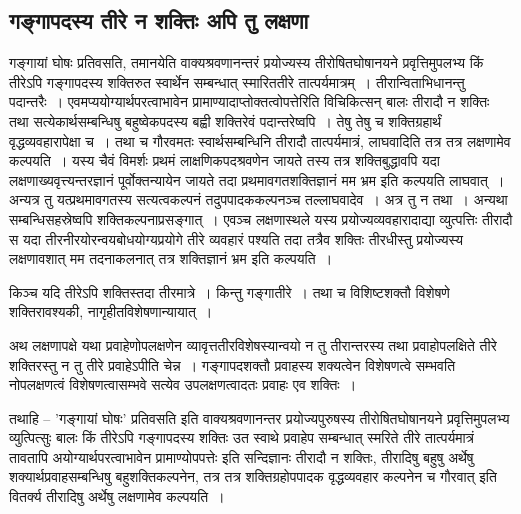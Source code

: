 			\subsection{}
			
				\begin{small}
			
			
				\end{small}
			
			\subsection{गङ्गापदस्य तीरे न शक्तिः अपि तु लक्षणा}

				\begin{small}
				
					गङ्गायां घोषः प्रतिवसति, तमानयेति वाक्यश्रवणानन्तरं प्रयोज्यस्य तीरोषितघोषानयने प्रवृत्तिमुपलभ्य किं तीरेऽपि गङ्गापदस्य शक्तिरुत स्वार्थेन सम्बन्धात् स्मारिततीरे तात्पर्यमात्रम्~। तीरान्विताभिधानन्तु पदान्तरैः~। एवमप्ययोग्यार्थपरत्वाभावेन प्रामाण्यादाप्तोक्तत्वोपत्तेरिति विचिकित्सन् बालः तीरादौ न शक्तिः तथा सत्येकार्थसम्बन्धिषु बहुष्वेकपदस्य बह्वी शक्तिरेवं पदान्तरेष्वपि~। तेषु तेषु च शक्तिग्रहार्थं वृद्धव्यवहारापेक्षा च~। तथा च गौरवमतः स्वार्थसम्बन्धिनि तीरादौ तात्पर्यमात्रं, लाघवादिति तत्र तत्र लक्षणामेव कल्पयति~। यस्य चैवं विमर्शः प्रथमं लाक्षणिकपदश्रवणेन जायते तस्य तत्र शक्तिबुद्धावपि यदा लक्षणाख्यवृत्त्यन्तरज्ञानं पूर्वोक्तन्यायेन जायते तदा प्रथमावगतशक्तिज्ञानं मम भ्रम इति कल्पयति लाघवात्~। अन्यत्र तु यत्प्रथमावगतस्य सत्यत्वकल्पनं तदुपपादककल्पनञ्च तल्लाघवादेव~। अत्र तु न तथा~। अन्यथा सम्बन्धिसहस्रेष्वपि शक्तिकल्पनाप्रसङ्गात्~। एवञ्च लक्षणास्थले यस्य प्रयोज्यव्यवहारादाद्या व्युत्पत्तिः तीरादौ स यदा तीरनीरयोरन्वयबोधयोग्यप्रयोगे तीरे व्यवहारं पश्यति तदा तत्रैव शक्तिः तीरधीस्तु प्रयोज्यस्य लक्षणावशात् मम तदनाकलनात् तत्र शक्तिज्ञानं भ्रम इति कल्पयति~। 
					
					किञ्च यदि तीरेऽपि शक्तिस्तदा तीरमात्रे~। किन्तु गङ्गातीरे~। तथा च विशिष्टशक्तौ विशेषणे शक्तिरावश्यकी, नागृहीतविशेषणान्यायात्~।
	
					अथ लक्षणापक्षे यथा प्रवाहेणोपलक्षणेन व्यावृत्ततीरविशेषस्यान्वयो न तु तीरान्तरस्य तथा प्रवाहोपलक्षिते तीरे शक्तिरस्तु न तु तीरे प्रवाहेऽपीति चेन्न~। गङ्गापदशक्तौ प्रवाहस्य शक्यत्वेन विशेषणत्वे सम्भवति नोपलक्षणत्वं विशेषणत्वासम्भवे सत्येव उपलक्षणत्वादतः प्रवाहः एव शक्तिः~। 
				\end{small}
 
				तथाहि – ’गङ्गायां घोषः’ प्रतिवसति इति वाक्यश्रवणानन्तर प्रयोज्यपुरुषस्य तीरोषितघोषानयने प्रवृत्तिमुपलभ्य व्युत्पित्सुः बालः किं तीरेऽपि गङ्गापदस्य शक्तिः उत स्वाथे प्रवाहेप सम्बन्धात् स्मरिते तीरे तात्पर्यमात्रं तावतापि अयोग्यार्थपरत्वाभावेन प्रामाण्योपपत्तेः इति सन्दिज्ञानः तीरादौ न शक्तिः,  तीरादिषु बहुषु अर्थेषु शक्यार्थप्रवाहसम्बन्धिषु बहुशक्तिकल्पनेन, तत्र तत्र शक्तिग्रहोपपादक वृद्धव्यवहार कल्पनेन च गौरवात् इति वितर्क्य तीरादिषु अर्थेषु लक्षणामेव कल्पयति~।
	
